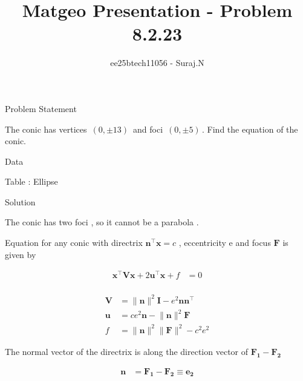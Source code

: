\documentclass{beamer}
\title{Matgeo Presentation - Problem 8.2.23}
\author{ee25btech11056 - Suraj.N}
\numberwithin{equation}{section}
\theoremstyle{remark}
\providecommand{\norm}[1]{\lVert#1\rVert}
\let\vec\mathbf
\begin{document}
\begin{frame}
  \titlepage
\end{frame}

\begin{frame}{Problem Statement}

The conic has vertices $\,(0,\pm 13)\,$ and foci $\,(0,\pm 5)\,$. Find the equation of the conic.

\end{frame}

\begin{frame}{Data}

\begin{table}[h!]
  \centering
  
  \caption*{Table : Ellipse}
  \label{8.2.23}
\end{table}

\end{frame}

\begin{frame}{Solution}

The conic has two foci , so it cannot be a parabola .

Equation for any conic with directrix $\vec{n}^\top\vec{x} = c$ , eccentricity e and focus $\vec{F}$ is given by 

\begin{align}
  \vec{x}^\top\vec{V}\vec{x} + 2\vec{u}^\top\vec{x} + f &= 0 \label{eq:conic} \\
\end{align}

\begin{align}
  \vec{V} &= \norm{\vec{n}}^2\vec{I} - e^2\vec{n}\vec{n}^\top \label{eq:matrixV} \\
  \vec{u} &= ce^2\vec{n} - \norm{\vec{n}}^2\vec{F} \label{eq:matrixu} \\
  f &= \norm{\vec{n}}^2\norm{\vec{F}}^2 - c^2e^2 \label{eq:f}
\end{align}

The normal vector of the directrix is along the direction vector of $\vec{F_1} - \vec{F_2}$

\begin{align}
  \vec{n} &= \vec{F_1} - \vec{F_2} \equiv \vec{e_2}
\end{align}

\end{frame}
\end{document}
